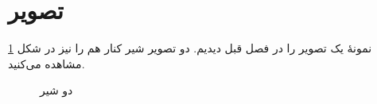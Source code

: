 \section{تصویر}
نمونهٔ یک تصویر را در فصل قبل دیدیم. دو تصویر شیر کنار هم را نیز در شکل
\ref{fig:twoLion}
مشاهده می‌کنید.
\begin{figure}[ht]
\centering 
{}
%
\caption{دو شیر}
\label{fig:twoLion} %
\end{figure}

